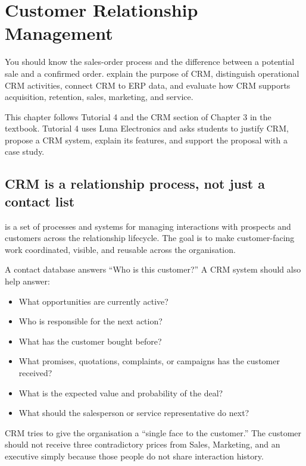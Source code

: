 \chapter{Customer Relationship Management}
\label{ch:crm}

\chapterguide
  {You should know the sales-order process and the difference between a potential sale and a confirmed order.}
  {explain the purpose of CRM, distinguish operational CRM activities, connect CRM to ERP data, and evaluate how CRM supports acquisition, retention, sales, marketing, and service.}

\begin{sourcebasis}
This chapter follows Tutorial 4 and the CRM section of Chapter 3 in the textbook. Tutorial 4 uses Luna Electronics and asks students to justify CRM, propose a CRM system, explain its features, and support the proposal with a case study.
\end{sourcebasis}

\section{CRM is a relationship process, not just a contact list}

 is a set of processes and systems for managing interactions with prospects and customers across the relationship lifecycle. The goal is to make customer-facing work coordinated, visible, and reusable across the organisation.

A contact database answers ``Who is this customer?'' A CRM system should also help answer:

\begin{itemize}
  \item What opportunities are currently active?
  \item Who is responsible for the next action?
  \item What has the customer bought before?
  \item What promises, quotations, complaints, or campaigns has the customer received?
  \item What is the expected value and probability of the deal?
  \item What should the salesperson or service representative do next?
\end{itemize}

\begin{intuition}
CRM tries to give the organisation a ``single face to the customer.'' The customer should not receive three contradictory prices from Sales, Marketing, and an executive simply because those people do not share interaction history.
\end{intuition}

